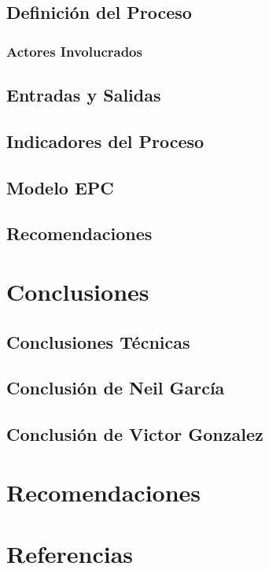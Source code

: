 \documentclass[12pt,letterpaper]{article}
\begin{document}
\subsection{Definición del Proceso}
\subsubsection{Actores Involucrados}
\subsection{Entradas y Salidas}
\subsection{Indicadores del Proceso}
\subsection{Modelo EPC}
\subsection{Recomendaciones}

\section{Conclusiones}
\subsection{Conclusiones Técnicas}
\subsection{Conclusión de Neil García}
\subsection{Conclusión de Victor Gonzalez}

\section{Recomendaciones}

\section{Referencias}
\end{document}

